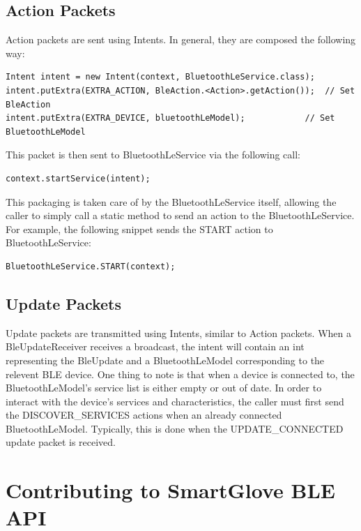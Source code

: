 \documentclass{scrreprt}
\begin{document}
\section{Action Packets}
Action packets are sent using Intents. In general, they are composed
the following way:
\begin{lstlisting}
Intent intent = new Intent(context, BluetoothLeService.class);
intent.putExtra(EXTRA_ACTION, BleAction.<Action>.getAction());	// Set BleAction
intent.putExtra(EXTRA_DEVICE, bluetoothLeModel);			// Set BluetoothLeModel
\end{lstlisting}
This packet is then sent to BluetoothLeService via the following call:
\begin{verbatim}context.startService(intent);\end{verbatim}
This packaging is taken care of by the BluetoothLeService itself,
allowing the caller to simply call a static method to send an action
to the BluetoothLeService. For example, the following snippet
sends the START action to BluetoothLeService:
\begin{verbatim}BluetoothLeService.START(context);\end{verbatim}

\section{Update Packets}
Update packets are transmitted using Intents, similar to Action packets.
When a BleUpdateReceiver receives a broadcast, the intent will contain
an int representing the BleUpdate and a BluetoothLeModel corresponding
to the relevent BLE device. One thing to note is that when a device is 
connected to, the BluetoothLeModel's service list is either empty or
out of date. In order to interact with the device's services and characteristics,
the caller must first send the DISCOVER_SERVICES actions when an already
connected BluetoothLeModel. Typically, this is done when the UPDATE_CONNECTED
update packet is received.


\chapter{Contributing to SmartGlove BLE API}
\end{document}
